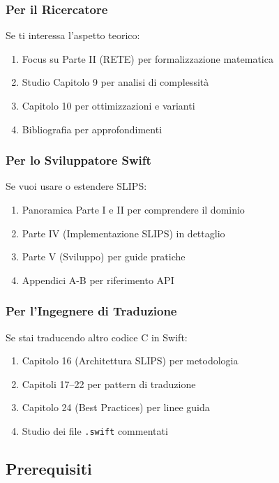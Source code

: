 \subsubsection{Per il Ricercatore}

Se ti interessa l'aspetto teorico:
\begin{enumerate}
\item Focus su Parte II (RETE) per formalizzazione matematica
\item Studio Capitolo 9 per analisi di complessità
\item Capitolo 10 per ottimizzazioni e varianti
\item Bibliografia per approfondimenti
\end{enumerate}

\subsubsection{Per lo Sviluppatore Swift}

Se vuoi usare o estendere SLIPS:
\begin{enumerate}
\item Panoramica Parte I e II per comprendere il dominio
\item Parte IV (Implementazione SLIPS) in dettaglio
\item Parte V (Sviluppo) per guide pratiche
\item Appendici A-B per riferimento API
\end{enumerate}

\subsubsection{Per l'Ingegnere di Traduzione}

Se stai traducendo altro codice C in Swift:
\begin{enumerate}
\item Capitolo 16 (Architettura SLIPS) per metodologia
\item Capitoli 17--22 per pattern di traduzione
\item Capitolo 24 (Best Practices) per linee guida
\item Studio dei file \texttt{.swift} commentati
\end{enumerate}

\subsection{Prerequisiti}

